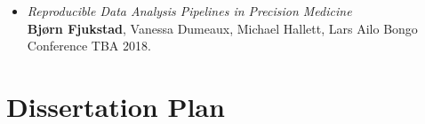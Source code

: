 \begin{itemize}
    \item \emph{Reproducible Data Analysis Pipelines in Precision Medicine}
        \\
        \textbf{Bjørn Fjukstad}, Vanessa Dumeaux, Michael Hallett, Lars Ailo
        Bongo
        \\
        Conference TBA 2018. 
        
\end{itemize} 




\section{Dissertation Plan} 



